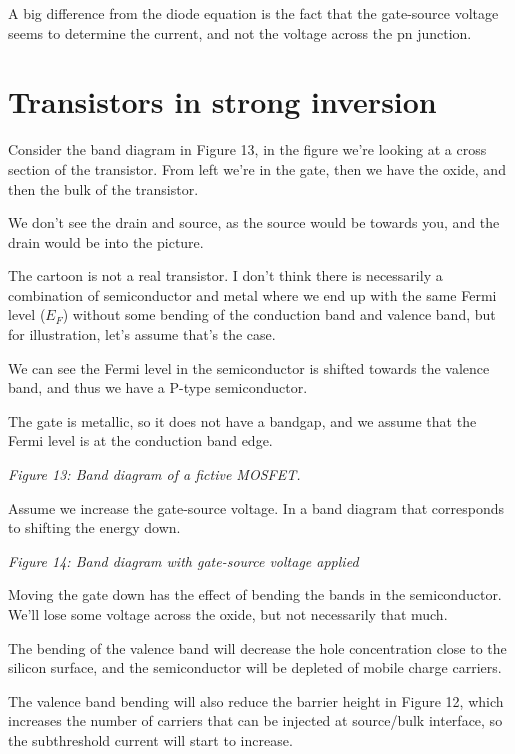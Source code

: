 A big difference from the diode equation is the fact that the
gate-source voltage seems to determine the current, and not the voltage
across the pn junction.

\section{Transistors in strong
inversion}\label{transistors-in-strong-inversion}

Consider the band diagram in Figure 13, in the figure we're looking at a
cross section of the transistor. From left we're in the gate, then we
have the oxide, and then the bulk of the transistor.

We don't see the drain and source, as the source would be towards you,
and the drain would be into the picture.

The cartoon is not a real transistor. I don't think there is necessarily
a combination of semiconductor and metal where we end up with the same
Fermi level (\(E_F\)) without some bending of the conduction band and
valence band, but for illustration, let's assume that's the case.

We can see the Fermi level in the semiconductor is shifted towards the
valence band, and thus we have a P-type semiconductor.

The gate is metallic, so it does not have a bandgap, and we assume that
the Fermi level is at the conduction band edge.


{
\centering
{}
}

\emph{Figure 13: Band diagram of a fictive MOSFET. }

Assume we increase the gate-source voltage. In a band diagram that
corresponds to shifting the energy down.


{
\centering
{}
}

\emph{Figure 14: Band diagram with gate-source voltage applied }

Moving the gate down has the effect of bending the bands in the
semiconductor. We'll lose some voltage across the oxide, but not
necessarily that much.

The bending of the valence band will decrease the hole concentration
close to the silicon surface, and the semiconductor will be depleted of
mobile charge carriers.

The valence band bending will also reduce the barrier height in Figure
12, which increases the number of carriers that can be injected at
source/bulk interface, so the subthreshold current will start to
increase.

